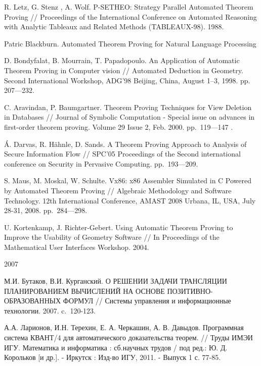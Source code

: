 \begin{thebibliography}{99}
  R. Letz, G. Stenz , A. Wolf. P-SETHEO: Strategy Parallel Automated Theorem Proving // Proceedings of the International Conference on Automated Reasoning with Analytic Tableaux and Related Methods (TABLEAUX-98). 1988.


 Patric Blackburn. Automated Theorem Proving for Natural Language Processing

 D. Bondyfalat, B. Mourrain, T. Papadopoulo. An Application of Automatic Theorem Proving in Computer vision // Automated Deduction in Geometry. Second International Workshop, ADG’98 Beijing, China, August 1–3, 1998. pp. 207---232.

 C. Aravindan, P. Baumgartner. Theorem Proving Techniques for View Deletion in Databases // Journal of Symbolic Computation - Special issue on advances in first-order theorem proving. Volume 29 Issue 2, Feb. 2000. pp.~119---147 .

 	Á. Darvas, R. Hähnle, D. Sands. A Theorem Proving Approach to Analysis of Secure Information Flow // SPC'05 Proceedings of the Second international conference on Security in Pervasive Computing. pp.~193---209.

 S. Maus, M. Moskal, W. Schulte. Vx86: x86 Assembler Simulated in C Powered by Automated Theorem Proving // Algebraic Methodology and Software Technology. 12th International Conference, AMAST 2008 Urbana, IL, USA, July 28-31, 2008. pp.~284---298.

 U. Kortenkamp, J. Richter-Gebert. Using Automatic Theorem Proving to Improve the Usability of Geometry Software // In Proceedings of the Mathematical User Interfaces Workshop. 2004. 

 2007


 М.И. Бутаков, В.И. Курганский. О РЕШЕНИИ ЗАДАЧИ ТРАНСЛЯЦИИ ПЛАНИРОВАНИЕМ ВЫЧИСЛЕНИЙ НА ОСНОВЕ ПОЗИТИВНО-ОБРАЗОВАННЫХ ФОРМУЛ // Системы управления и информационные технологии. 2007. c.~120-123.

 А.А. Ларионов, И.Н. Терехин, Е. А. Черкашин, А. В. Давыдов.
Программная система КВАНТ/4 для автоматического доказательства теорем.
// Труды ИМЭИ ИГУ. Математика и информатика : сб.научных трудов / под
ред.: Ю. Д. Корольков [и др.]. - Иркутск : Изд-во ИГУ, 2011. - Выпуск
1 с. 77-85.


\end{thebibliography}
